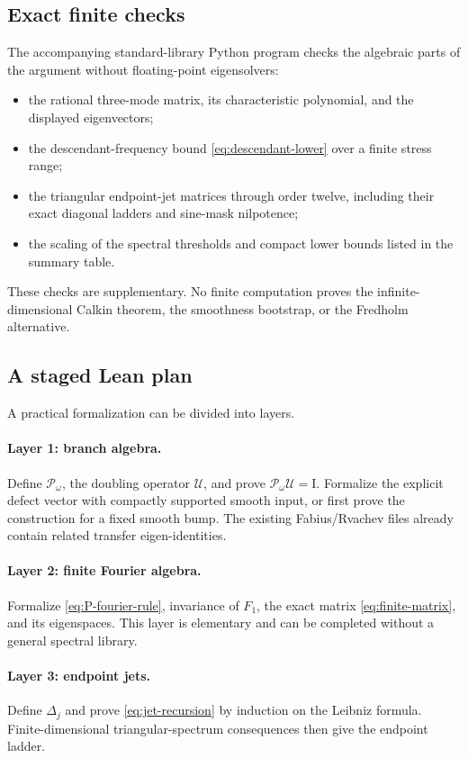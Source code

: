 \documentclass[11pt,a4paper]{article}
\theoremstyle{definition}
\theoremstyle{remark}
\newcommand{\Pop}{\mathcal P}
\newcommand{\Uop}{\mathcal U}
\newcommand{\id}{\mathrm I}
\begin{document}
\subsection{Exact finite checks}
The accompanying standard-library Python program checks the algebraic parts
of the argument without floating-point eigensolvers:
\begin{itemize}
\item the rational three-mode matrix, its characteristic polynomial, and the
      displayed eigenvectors;
\item the descendant-frequency bound \eqref{eq:descendant-lower} over a
      finite stress range;
\item the triangular endpoint-jet matrices through order twelve, including
      their exact diagonal ladders and sine-mask nilpotence;
\item the scaling of the spectral thresholds and compact lower bounds listed
      in the summary table.
\end{itemize}
These checks are supplementary.  No finite computation proves the
infinite-dimensional Calkin theorem, the smoothness bootstrap, or the
Fredholm alternative.

\subsection{A staged Lean plan}
A practical formalization can be divided into layers.

\paragraph{Layer 1: branch algebra.}
Define $\Pop_\omega$, the doubling operator $\Uop$, and prove
$\Pop_\omega\Uop=\id$.  Formalize the explicit defect vector with compactly
supported smooth input, or first prove the construction for a fixed smooth
bump.  The existing Fabius/Rvachev files already contain related transfer
eigen-identities.

\paragraph{Layer 2: finite Fourier algebra.}
Formalize \eqref{eq:P-fourier-rule}, invariance of $F_1$, the exact matrix
\eqref{eq:finite-matrix}, and its eigenspaces.  This layer is elementary and
can be completed without a general spectral library.

\paragraph{Layer 3: endpoint jets.}
Define $\Delta_j$ and prove \eqref{eq:jet-recursion} by induction on the
Leibniz formula.  Finite-dimensional triangular-spectrum consequences then
give the endpoint ladder.
\end{document}
